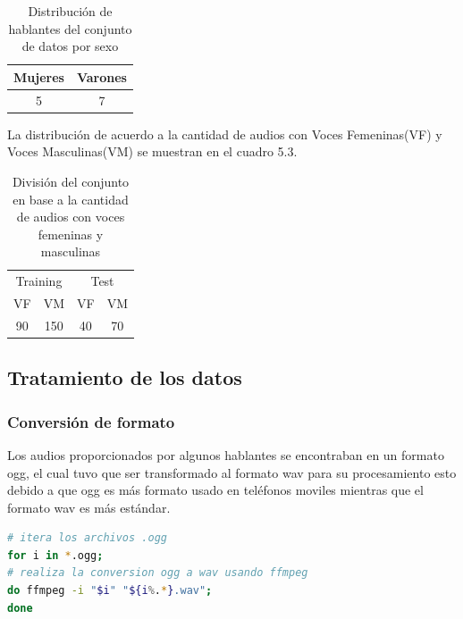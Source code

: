 \begin{table}[H]
	\centering
	\begin{tabular}{|c|c|}
		\hline
		\rowcolor{Gray}Mujeres & Varones \\ \hline
		5      & 7   \\ \hline
	\end{tabular}
	\caption{Distribución de hablantes del conjunto de datos por sexo}
\end{table}


La distribución de acuerdo a la cantidad de audios con Voces Femeninas(VF) y Voces Masculinas(VM) se muestran en el cuadro 5.3.

\begin{table}[H]
	\centering
	\begin{tabular}{|c|c|c|c|}
		\hline
		\rowcolor{Gray} 	\multicolumn{4}{|c|}{conjunto de datos}                    \\ \hline
		\multicolumn{2}{|c|}{Training} & \multicolumn{2}{c|}{Test} \\ \hline
		VF              & VM             & VF          & VM           \\ \hline
		90             & 150           & 40          & 70         \\ \hline
	\end{tabular}
	\caption{División del conjunto en base a la cantidad de audios con voces femeninas y masculinas}
\end{table}

\subsection{Tratamiento de los datos}

\subsubsection{Conversión de formato}
Los audios proporcionados por algunos hablantes se encontraban en un formato ogg, el cual tuvo que ser transformado al formato wav para su procesamiento esto debido a que ogg es más formato usado en teléfonos moviles mientras que el formato wav es más estándar.
\begin{lstlisting}[language=Bash,caption=Bash para conversión de formato,captionpos=b]
# itera los archivos .ogg
for i in *.ogg;
# realiza la conversion ogg a wav usando ffmpeg
do ffmpeg -i "$i" "${i%.*}.wav"; 
done

\end{lstlisting}
